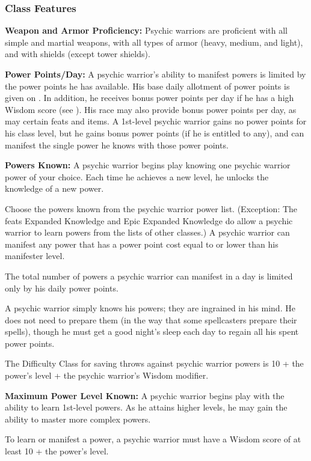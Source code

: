 \subsubsection{Class Features}

\textbf{Weapon and Armor Proficiency:} Psychic warriors are proficient with all simple and martial weapons, with all types of armor (heavy, medium, and light), and with shields (except tower shields).

\textbf{Power Points/Day:} A psychic warrior's ability to manifest powers is limited by the power points he has available. His base daily allotment of power points is given on . In addition, he receives bonus power points per day if he has a high Wisdom score (see ). His race may also provide bonus power points per day, as may certain feats and items. A 1st-level psychic warrior gains no power points for his class level, but he gains bonus power points (if he is entitled to any), and can manifest the single power he knows with those power points.

\textbf{Powers Known:} A psychic warrior begins play knowing one psychic warrior power of your choice. Each time he achieves a new level, he unlocks the knowledge of a new power.

Choose the powers known from the psychic warrior power list. (Exception: The feats Expanded Knowledge and Epic Expanded Knowledge do allow a psychic warrior to learn powers from the lists of other classes.) A psychic warrior can manifest any power that has a power point cost equal to or lower than his manifester level.

The total number of powers a psychic warrior can manifest in a day is limited only by his daily power points.

A psychic warrior simply knows his powers; they are ingrained in his mind. He does not need to prepare them (in the way that some spellcasters prepare their spells), though he must get a good night's sleep each day to regain all his spent power points.

The Difficulty Class for saving throws against psychic warrior powers is 10 + the power's level + the psychic warrior's Wisdom modifier.

\textbf{Maximum Power Level Known:} A psychic warrior begins play with the ability to learn 1st-level powers. As he attains higher levels, he may gain the ability to master more complex powers.

To learn or manifest a power, a psychic warrior must have a Wisdom score of at least 10 + the power's level.

